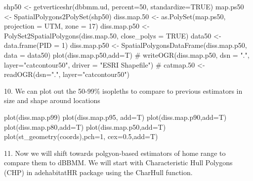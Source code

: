 \documentclass[
  letterpaper,
]{book}
\newenvironment{Shaded}{\begin{snugshade}}{\end{snugshade}}
\newcommand{\AttributeTok}[1]{\textcolor[rgb]{0.40,0.45,0.13}{#1}}
\newcommand{\CommentTok}[1]{\textcolor[rgb]{0.37,0.37,0.37}{#1}}
\newcommand{\ConstantTok}[1]{\textcolor[rgb]{0.56,0.35,0.01}{#1}}
\newcommand{\DecValTok}[1]{\textcolor[rgb]{0.68,0.00,0.00}{#1}}
\newcommand{\FloatTok}[1]{\textcolor[rgb]{0.68,0.00,0.00}{#1}}
\newcommand{\FunctionTok}[1]{\textcolor[rgb]{0.28,0.35,0.67}{#1}}
\newcommand{\NormalTok}[1]{\textcolor[rgb]{0.00,0.23,0.31}{#1}}
\newcommand{\OtherTok}[1]{\textcolor[rgb]{0.00,0.23,0.31}{#1}}
\newcommand{\StringTok}[1]{\textcolor[rgb]{0.13,0.47,0.30}{#1}}
\begin{document}
\begin{Shaded}
\begin{Highlighting}[]
\NormalTok{shp50 }\OtherTok{\textless{}{-}} \FunctionTok{getverticeshr}\NormalTok{(dbbmm.ud, }\AttributeTok{percent=}\DecValTok{50}\NormalTok{, }\AttributeTok{standardize=}\ConstantTok{TRUE}\NormalTok{)}
\NormalTok{map.ps50 }\OtherTok{\textless{}{-}} \FunctionTok{SpatialPolygons2PolySet}\NormalTok{(shp50)}
\NormalTok{diss.map}\FloatTok{.50} \OtherTok{\textless{}{-}} \FunctionTok{as.PolySet}\NormalTok{(map.ps50, }\AttributeTok{projection =} \StringTok{\textquotesingle{}UTM\textquotesingle{}}\NormalTok{, }\AttributeTok{zone =} \StringTok{\textquotesingle{}17\textquotesingle{}}\NormalTok{)}
\NormalTok{diss.map.p50 }\OtherTok{\textless{}{-}} \FunctionTok{PolySet2SpatialPolygons}\NormalTok{(diss.map}\FloatTok{.50}\NormalTok{, }\AttributeTok{close\_polys =} \ConstantTok{TRUE}\NormalTok{)}
\NormalTok{data50 }\OtherTok{\textless{}{-}} \FunctionTok{data.frame}\NormalTok{(}\AttributeTok{PID =} \DecValTok{1}\NormalTok{)}
\NormalTok{diss.map.p50 }\OtherTok{\textless{}{-}} \FunctionTok{SpatialPolygonsDataFrame}\NormalTok{(diss.map.p50, }\AttributeTok{data =}\NormalTok{ data50)}
\FunctionTok{plot}\NormalTok{(diss.map.p50,}\AttributeTok{add=}\NormalTok{T)}
\CommentTok{\# writeOGR(diss.map.p50, dsn = ".", layer="catcontour50", driver = "ESRI Shapefile")}
\CommentTok{\# catmap.50 \textless{}{-} readOGR(dsn=".", layer="catcontour50")}
\end{Highlighting}
\end{Shaded}

10. We can plot out the 50-99\% isopleths to compare to previous
estimators in size and shape around locations

\begin{Shaded}
\begin{Highlighting}[]
\FunctionTok{plot}\NormalTok{(diss.map.p99)}
\FunctionTok{plot}\NormalTok{(diss.map.p95, }\AttributeTok{add=}\NormalTok{T)}
\FunctionTok{plot}\NormalTok{(diss.map.p90,}\AttributeTok{add=}\NormalTok{T)}
\FunctionTok{plot}\NormalTok{(diss.map.p80,}\AttributeTok{add=}\NormalTok{T)}
\FunctionTok{plot}\NormalTok{(diss.map.p50,}\AttributeTok{add=}\NormalTok{T)}
\FunctionTok{plot}\NormalTok{(}\FunctionTok{st\_geometry}\NormalTok{(coords),}\AttributeTok{pch=}\DecValTok{1}\NormalTok{, }\AttributeTok{cex=}\FloatTok{0.5}\NormalTok{,}\AttributeTok{add=}\NormalTok{T)}
\end{Highlighting}
\end{Shaded}

11. Now we will shift towards polgyon-based estimators of home range to
compare them to dBBMM. We will start with Characteristic Hull Polygons
(CHP) in adehabitatHR package using the CharHull function.
\end{document}
